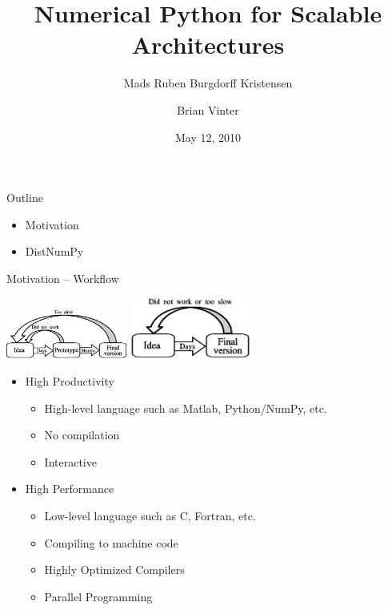 \documentclass{beamer}
\title{Numerical Python for Scalable Architectures}
\author{Mads Ruben Burgdorff Kristensen \and Brian Vinter}
\institute{eScience Centre}
\date{May 12, 2010}
\begin{document}

\begin{frame}{Outline}
\begin{itemize}
\item Motivation
\item DistNumPy
\end{itemize}
\end{frame}


\begin{frame}{Motivation -- Workflow}
\begin{center}
\includegraphics[width=150px]{../gfx/workflow1}
\includegraphics[width=150px]{../gfx/workflow2}
\end{center}
\begin{itemize}
\item High Productivity
  \begin{itemize}
    \item High-level language such as Matlab, Python/NumPy, etc.
    \item No compilation
    \item Interactive
  \end{itemize}
\item High Performance
  \begin{itemize}
    \item Low-level language such as C, Fortran, etc.
    \item Compiling to machine code
    \item Highly Optimized Compilers
    \item Parallel Programming
  \end{itemize}
\end{itemize}
\end{frame}

\end{document}

